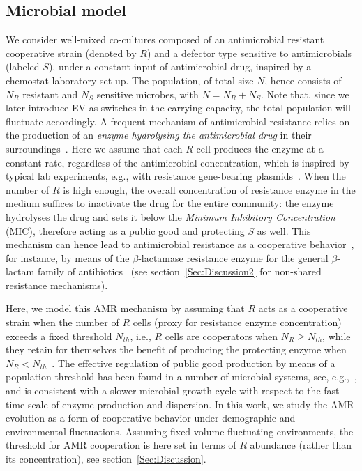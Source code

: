 \documentclass{article}
\begin{document}
\subsection{Microbial model}\label{Sec:Model}
We consider well-mixed co-cultures composed of an antimicrobial resistant cooperative strain (denoted by $R$) and a defector type sensitive to antimicrobials (labeled $S$), under a constant input of antimicrobial drug, inspired by a chemostat laboratory set-up. The population, of total size $N$, hence consists of \(N_R\) resistant and \(N_S\) sensitive microbes, with \(N=N_R+N_S\). Note that, since we later introduce EV as switches in the carrying capacity, the total population will fluctuate accordingly. A frequent mechanism of antimicrobial resistance relies on the production of an \emph{enzyme hydrolysing the antimicrobial drug} in their surroundings~\cite{davies1994inactivation,Wright05,Yurtsev13}. Here we assume that each \(R\) cell produces the enzyme at a constant rate, regardless of the antimicrobial concentration, which is inspired by typical lab experiments, e.g., with resistance gene-bearing plasmids~\cite{Yurtsev13, bottery2016selective}. When the number of \(R\) is high enough, the overall concentration of resistance enzyme in the medium suffices to inactivate the drug for the entire community: the enzyme hydrolyses the drug and sets it below the \emph{Minimum Inhibitory Concentration} (MIC), therefore acting as a public good and protecting \(S\) as well. This mechanism can hence lead to antimicrobial resistance as a cooperative behavior~\cite{davies1994inactivation,Wright05,Yurtsev13}, for instance, by means of the \(\beta\)-lactamase resistance enzyme for the general \(\beta\)-lactam family of antibiotics~\cite{brook2009role} (see section~\ref{Sec:Discussion2} for non-shared resistance mechanisms).
 
Here, we model this AMR mechanism by assuming that $R$ acts as a cooperative strain when the number of $R$ cells (proxy for resistance enzyme concentration) exceeds a fixed threshold \(N_{th}\), i.e., $R$ cells are cooperators when \(N_R\geq N_{th}\), while they retain for themselves the benefit of producing the protecting enzyme when \(N_R< N_{th}\)~\cite{brook2004beta,Yurtsev13,vega2014collective,meredith2015collective,bottery2016selective}. The effective regulation of public good production by means of a population threshold has been found in a number of microbial systems, see, e.g.,~\cite{Brown01,Camilli06,Brockhurst07,sanchez2013feedback,vega2014collective}, and is consistent with a slower microbial growth cycle with respect to the fast time scale of enzyme production and dispersion. In this work, we study the AMR evolution as a form of cooperative behavior under demographic and environmental fluctuations. Assuming fixed-volume fluctuating environments, the threshold for AMR cooperation is here set in terms of $R$ abundance (rather than its concentration), see section~\ref{Sec:Discussion}.
\end{document}
